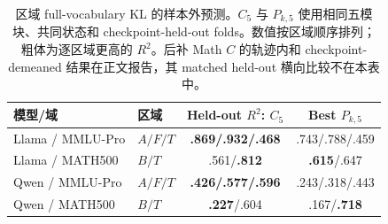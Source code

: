 \begin{table}[!t]
\centering
\small
\setlength{\tabcolsep}{4pt}
\begin{tabular}{llcc}
\toprule
模型/域 & 区域 & Held-out $R^2$: $C_5$ & Best $P_{k,5}$ \\
\midrule
Llama / MMLU-Pro & $A/F/T$ & \textbf{.869/.932/.468} & .743/.788/.459 \\
Llama / MATH500 & $B/T$ & .561/\textbf{.812} & \textbf{.615}/.647 \\
Qwen / MMLU-Pro & $A/F/T$ & \textbf{.426/.577/.596} & .243/.318/.443 \\
Qwen / MATH500 & $B/T$ & \textbf{.227}/.604 & .167/\textbf{.718} \\
\bottomrule
\end{tabular}
\caption{区域 full-vocabulary KL 的样本外预测。$C_5$ 与 $P_{k,5}$ 使用相同五模块、共同状态和 checkpoint-held-out folds。数值按区域顺序排列；粗体为逐区域更高的 $R^2$。后补 Math $C$ 的轨迹内和 checkpoint-demeaned 结果在正文报告，其 matched held-out 横向比较不在本表中。}
\label{tab:regional-prediction}
\end{table}
